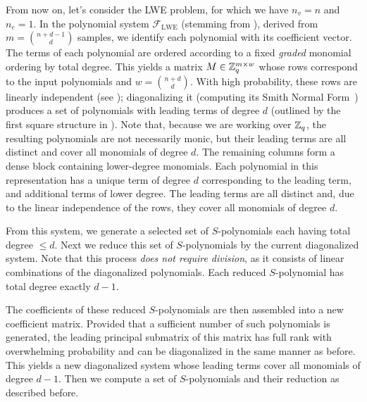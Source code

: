 From now on, let's consider the LWE problem, for which we have $n_v=n$ and $n_e=1$. In the polynomial system $\mathcal{F}_{\mathrm{LWE}}$ (stemming from \slwe), derived from $m = \binom{n+d-1}{d}$ samples, we identify each polynomial with its coefficient vector. The terms of each polynomial are ordered according to a fixed \emph{graded} monomial ordering by total degree. 
This yields a matrix $M \in \mathbb{Z}_q^{m \times w}$ whose rows correspond to the input polynomials and $w = \binom{n+d}{d}$.
With high probability, these rows are linearly independent (see ); diagonalizing it (computing its Smith Normal Form~\cite{DBLP:conf/issac/Storjohann96}) produces a set of polynomials with leading terms of degree $d$ (outlined by the first square structure in ). Note that, because we are working over $\mathbb{Z}_q$, the resulting polynomials are not necessarily monic, but their leading terms are all distinct and cover all monomials of degree $d$.
The remaining columns form a dense block containing lower-degree monomials. Each polynomial in this representation has a unique term of degree $d$ corresponding to the leading term, and additional terms of lower degree. The leading terms are all distinct and, due to the linear independence of the rows, they cover all monomials of degree $d$.


From this system, we generate a selected set of $S$-polynomials each having total degree $ \leq d$. Next we reduce this set of $S$-polynomials by the current diagonalized system. Note that this process \emph{does not require division}, as it consists of linear combinations of the diagonalized polynomials. Each reduced $S$-polynomial has total degree exactly $d-1$.

The coefficients of these reduced $S$-polynomials are then assembled into a new coefficient matrix.
Provided that a sufficient number of such polynomials is generated, the leading principal submatrix of this matrix has full rank with overwhelming probability and can be diagonalized in the same manner as before. %
This yields a new diagonalized system whose leading terms cover all monomials of degree $d-1$. Then we compute a set of $S$-polynomials and their reduction as described before. 

